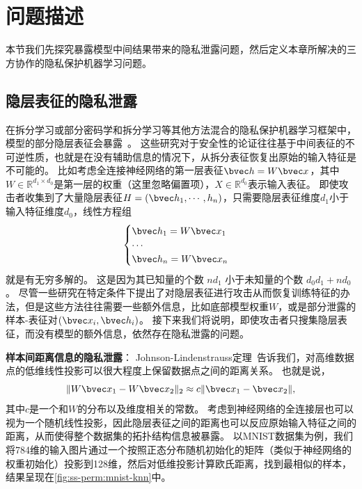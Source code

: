 \section{问题描述}
本节我们先探究暴露模型中间结果带来的隐私泄露问题，然后定义本章所解决的三方协作的隐私保护机器学习问题。

\subsection{隐层表征的隐私泄露}
在拆分学习或部分密码学和拆分学习等其他方法混合的隐私保护机器学习框架中，模型的部分隐层表征会暴露~\cite{}。
%
这些研究对于安全性的论证往往基于中间表征的不可逆性质，也就是在没有辅助信息的情况下，从拆分表征恢复出原始的输入特征是不可能的。
%
比如考虑全连接神经网络的第一层表征$\bvec h=W \bvec x$，其中$W \in \mathbb R^{d_1 \times d_0}$是第一层的权重（这里忽略偏置项），$X \in \mathbb R^{d_0}$表示输入表征。
%
即使攻击者收集到了大量隐层表征$H = (\bvec h_1, \cdots, h_n)$，只需要隐层表征维度$d_1$小于输入特征维度$d_0$，线性方程组
\begin{equation}
\begin{cases}
    \bvec h_1 = W \bvec x_1 \\
    \cdots \\
    \bvec h_n = W \bvec x_n \\
\end{cases}
\end{equation}
就是有无穷多解的。
%
这是因为其已知量的个数 $nd_1$ 小于未知量的个数 $d_0d_1 + nd_0$。
%
尽管一些研究在特定条件下提出了对隐层表征进行攻击从而恢复训练特征的办法，但是这些方法往往需要一些额外信息，比如底部模型权重$W$，或是部分泄露的样本-表征对$(\bvec x_i, \bvec h_i)$。
%
接下来我们将说明，即使攻击者只搜集隐层表征，而没有模型的额外信息，依然存在隐私泄露的问题。

\textbf{样本间距离信息的隐私泄露}：
%
Johnson-Lindenstrauss定理~\cite{}告诉我们，对高维数据点的低维线性投影可以很大程度上保留数据点之间的距离关系。
%
也就是说，
\begin{equation}
    \Vert W \bvec x_1 - W \bvec x_2 \Vert_2 \approx c\Vert \bvec x_1 - \bvec x_2 \Vert,    
\end{equation}
其中$c$是一个和$W$的分布以及维度相关的常数。
%
考虑到神经网络的全连接层也可以视为一个随机线性投影，因此隐层表征之间的距离也可以反应原始输入特征之间的距离，从而使得整个数据集的拓扑结构信息被暴露。
%
以MNIST数据集为例，我们将784维的输入图片通过一个按照正态分布随机初始化的矩阵（类似于神经网络的权重初始化）投影到128维，然后对低维投影计算欧氏距离，找到最相似的样本，结果呈现在\autoref{fig:ss-perm:mnist-knn}中。
%

